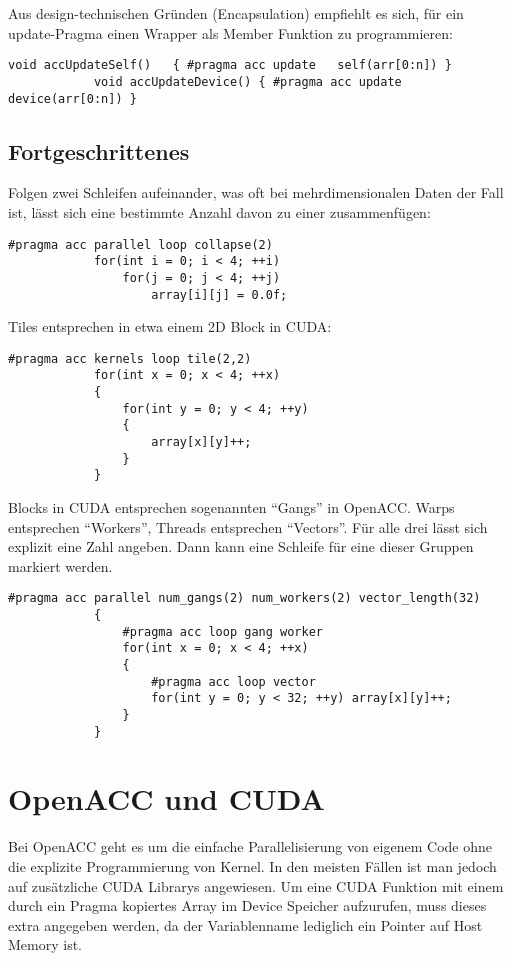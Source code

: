			Aus design-technischen Gründen (Encapsulation) empfiehlt es sich, für ein update-Pragma einen Wrapper als Member Funktion zu programmieren:
			
			\begin{lstlisting}[caption=OpenACC: Update Member-Funktion]
			void accUpdateSelf()   { #pragma acc update   self(arr[0:n]) }
			void accUpdateDevice() { #pragma acc update device(arr[0:n]) }			
			\end{lstlisting}

			\subsection{Fortgeschrittenes}
			Folgen zwei Schleifen aufeinander, was oft bei mehrdimensionalen Daten der Fall ist, lässt sich eine bestimmte Anzahl davon zu einer zusammenfügen:
			
			\begin{lstlisting}[caption=OpenACC: Loop Collapse]
			#pragma acc parallel loop collapse(2)
			for(int i = 0; i < 4; ++i) 
				for(j = 0; j < 4; ++j)
					array[i][j] = 0.0f;
			\end{lstlisting}
			
			Tiles entsprechen in etwa einem 2D \Gls{Block} in CUDA:
			
			\begin{lstlisting}[caption=OpenACC: Tile]
			#pragma acc kernels loop tile(2,2)
			for(int x = 0; x < 4; ++x)
			{
				for(int y = 0; y < 4; ++y)
				{
					array[x][y]++;
				}
			}
			\end{lstlisting}
			
			\Glspl{Block} in CUDA entsprechen sogenannten \enquote{\Glspl{Gang}} in OpenACC. \Glspl{Warp} entsprechen \enquote{\Glspl{Worker}}, \Glspl{Thread} entsprechen \enquote{\Glspl{Vector}}. Für alle drei lässt sich explizit eine Zahl angeben. Dann kann eine Schleife für eine dieser Gruppen markiert werden.
			
			\newpage
			
			\begin{lstlisting}[caption=OpenACC: Gangs Workers Vectors]
			#pragma acc parallel num_gangs(2) num_workers(2) vector_length(32)
			{
				#pragma acc loop gang worker
				for(int x = 0; x < 4; ++x)
				{
					#pragma acc loop vector
					for(int y = 0; y < 32; ++y) array[x][y]++;
				}
			}			
			\end{lstlisting}
			
		\section{OpenACC und CUDA}
		Bei OpenACC geht es um die einfache Parallelisierung von eigenem Code ohne die explizite Programmierung von \Gls{Kernel}. In den meisten Fällen ist man jedoch auf zusätzliche CUDA Librarys angewiesen. Um eine CUDA Funktion mit einem durch ein Pragma kopiertes Array im Device Speicher aufzurufen, muss dieses extra angegeben werden, da der Variablenname lediglich ein Pointer auf Host Memory ist.
		
